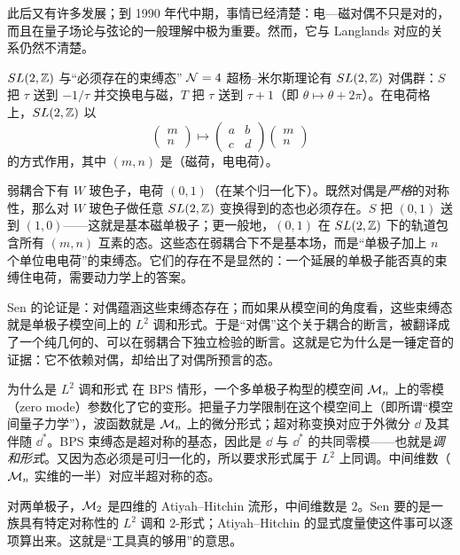 此后又有许多发展；到 1990 年代中期，事情已经清楚：电—磁对偶不只是对的，而且在量子场论与弦论的一般理解中极为重要。然而，它与 Langlands 对应的关系仍然不清楚。

\begin{pizhu}{$SL(2,\mathbb{Z})$ 与“必须存在的束缚态”}
$\mathcal{N}=4$ 超杨--米尔斯理论有 $SL(2,\mathbb{Z})$ 对偶群：$S$ 把 $\tau$ 送到 $-1/\tau$ 并交换电与磁，$T$ 把 $\tau$ 送到 $\tau+1$（即 $\theta\mapsto\theta+2\pi$）。在电荷格上，$SL(2,\mathbb{Z})$ 以
\[
  \begin{pmatrix}m\\ n\end{pmatrix}\longmapsto
  \begin{pmatrix}a&b\\ c&d\end{pmatrix}\begin{pmatrix}m\\ n\end{pmatrix}
\]
的方式作用，其中 $(m,n)$ 是（磁荷，电电荷）。

弱耦合下有 $W$ 玻色子，电荷 $(0,1)$（在某个归一化下）。既然对偶是\emph{严格}的对称性，那么对 $W$ 玻色子做任意 $SL(2,\mathbb{Z})$ 变换得到的态也必须存在。$S$ 把 $(0,1)$ 送到 $(1,0)$——这就是基本磁单极子；更一般地，$(0,1)$ 在 $SL(2,\mathbb{Z})$ 下的轨道包含所有 $(m,n)$ 互素的态。这些态在弱耦合下不是基本场，而是“单极子加上 $n$ 个单位电电荷”的束缚态。它们的存在不是显然的：一个延展的单极子能否真的束缚住电荷，需要动力学上的答案。

Sen 的论证是：对偶蕴涵这些束缚态存在；而如果从模空间的角度看，这些束缚态就是单极子模空间上的 $L^2$ 调和形式。于是“对偶”这个关于耦合的断言，被翻译成了一个纯几何的、可以在弱耦合下独立检验的断言。这就是它为什么是一锤定音的证据：它不依赖对偶，却给出了对偶所预言的态。
\end{pizhu}

\begin{pizhu}{为什么是 $L^2$ 调和形式}
在 BPS 情形，一个多单极子构型的模空间 $\mathcal{M}_n$ 上的零模（zero mode）参数化了它的变形。把量子力学限制在这个模空间上（即所谓“模空间量子力学”），波函数就是 $\mathcal{M}_n$ 上的微分形式；超对称变换对应于外微分 $\dd$ 及其伴随 $\dd^*$。BPS 束缚态是超对称的基态，因此是 $\dd$ 与 $\dd^*$ 的共同零模——也就是\emph{调和形式}。又因为态必须是可归一化的，所以要求形式属于 $L^2$ 上同调。中间维数（$\mathcal{M}_n$ 实维的一半）对应半超对称的态。

对两单极子，$\mathcal{M}_2$ 是四维的 Atiyah--Hitchin 流形，中间维数是 $2$。Sen 要的是一族具有特定对称性的 $L^2$ 调和 $2$-形式；Atiyah--Hitchin 的显式度量使这件事可以逐项算出来。这就是“工具真的够用”的意思。
\end{pizhu}

